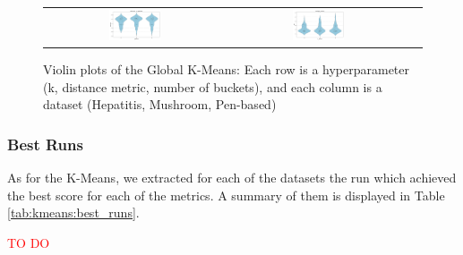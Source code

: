 \begin{figure}[h]
\begin{tabular}{ccc}
        \includegraphics[width=0.3\textwidth]{figures/GlobalKMeans/mushroom_violin_N_Buckets_vs_Silhouette.png} & 
        \includegraphics[width=0.3\textwidth]{figures/GlobalKMeans/penbased_violin_N_Buckets_vs_DBI.png} \\
    \end{tabular}
    \caption{Violin plots of the Global K-Means: Each row is a hyperparameter (k, distance metric, number of buckets), and each column is a dataset (Hepatitis, Mushroom, Pen-based)}
    \label{fig:globalkmeans:violin}
\end{figure}

\subsubsection{Best Runs}
As for the K-Means, we extracted for each of the datasets the run which achieved the best score for each of the metrics. A summary of them is displayed in Table \ref{tab:kmeans:best_runs}.

\textcolor{red}{TO DO}

